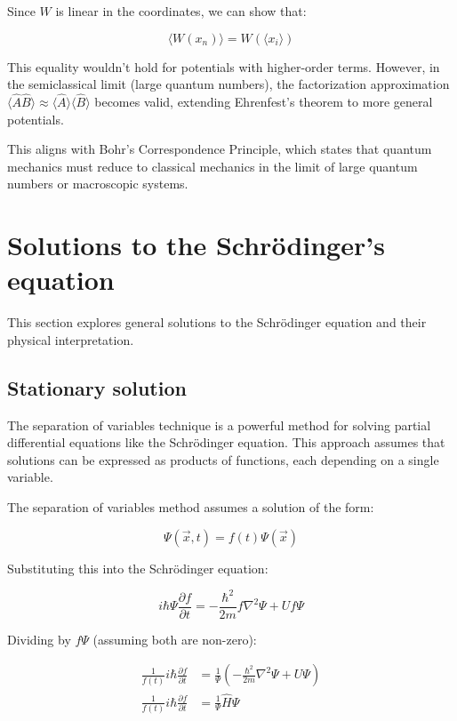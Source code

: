 \documentclass[italian]{HKNdocument}
\begin{document}
Since $W$ is linear in the coordinates, we can show that:

\begin{equation}
\langle W(x_n)\rangle = W(\langle x_i\rangle) \label{eq:1.97}
\end{equation}

This equality wouldn't hold for potentials with higher-order terms. However, in the semiclassical limit (large quantum numbers), the factorization approximation $\langle\hat{A}\hat{B}\rangle \approx \langle\hat{A}\rangle\langle\hat{B}\rangle$ becomes valid, extending Ehrenfest's theorem to more general potentials.

This aligns with Bohr's Correspondence Principle, which states that quantum mechanics must reduce to classical mechanics in the limit of large quantum numbers or macroscopic systems.

\section{Solutions to the Schrödinger's equation}

This section explores general solutions to the Schrödinger equation and their physical interpretation.

\subsection{Stationary solution}

The separation of variables technique is a powerful method for solving partial differential equations like the Schrödinger equation. This approach assumes that solutions can be expressed as products of functions, each depending on a single variable.


The separation of variables method assumes a solution of the form:

\begin{equation}
\Psi(\vec{x}, t) = f(t)\Psi(\vec{x}) \label{eq:2.1}
\end{equation}

Substituting this into the Schrödinger equation:

\begin{equation}
i\hbar\Psi\frac{\partial f}{\partial t} = -\frac{\hbar^2}{2m}f\nabla^2\Psi + Uf\Psi \label{eq:2.2}
\end{equation}

Dividing by $f\Psi$ (assuming both are non-zero):

\begin{align}
\frac{1}{f(t)}i\hbar\frac{\partial f}{\partial t} &= \frac{1}{\Psi}\left(-\frac{\hbar^2}{2m}\nabla^2\Psi + U\Psi\right) \\
\frac{1}{f(t)}i\hbar\frac{\partial f}{\partial t} &= \frac{1}{\Psi}\hat{H}\Psi \label{eq:2.3}
\end{align}
\end{document}
